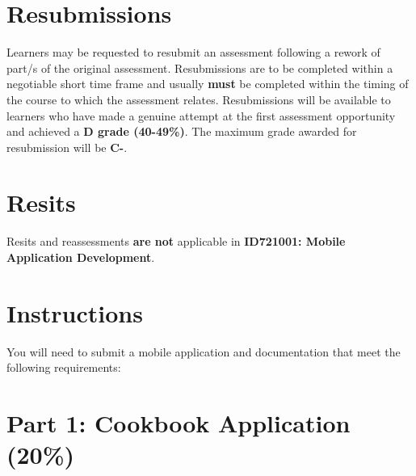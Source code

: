 \documentclass{article}
\begin{document}
\section*{Resubmissions}
Learners may be requested to resubmit an assessment following a rework of part/s of the original assessment. Resubmissions are to be completed within a negotiable short time frame and usually \textbf{must} be completed within the timing of the course to which the assessment relates. Resubmissions will be available to learners who have made a genuine attempt at the first assessment opportunity and achieved a \textbf{D grade (40-49\%)}. The maximum grade awarded for resubmission will be \textbf{C-}.

\section*{Resits}
Resits and reassessments \textbf{are not} applicable in \textbf{ID721001: Mobile Application Development}.

\section*{Instructions}
You will need to submit a mobile application and documentation that meet the following requirements:

\section{Part 1: Cookbook Application (20\%)}
\end{document}
